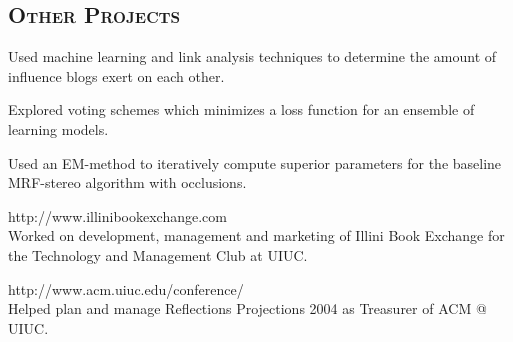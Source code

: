 \begin{resume}


\section{\textsc{Other Projects}}

\begin{position}
Used machine learning and link analysis techniques to determine the amount of influence blogs exert on each other.
\end{position}

\begin{position}
Explored voting schemes which minimizes a loss function for an ensemble of learning models. 
\end{position}

\begin{position}
Used an EM-method to iteratively compute superior parameters for the baseline MRF-stereo algorithm with occlusions.
\end{position}

\begin{position}
http://www.illinibookexchange.com\\
Worked on development, management and marketing of Illini Book Exchange for the Technology and Management Club at UIUC. 
\end{position}

\begin{position}
http://www.acm.uiuc.edu/conference/\\
Helped plan and manage Reflections Projections 2004 as Treasurer of ACM @ UIUC.
\end{position}



\end{resume}
